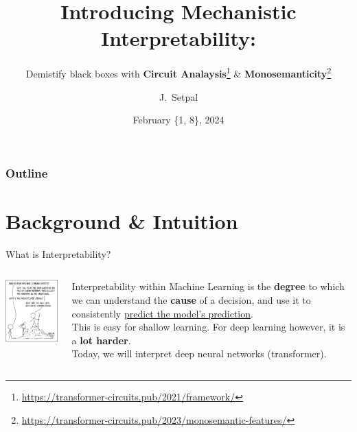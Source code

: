 \documentclass{beamer}
\title[Mechanistic Interpretability]{Introducing Mechanistic Interpretability:}
\subtitle{Demistify black boxes with \textbf{Circuit Analaysis}\thanks{\tiny \url{https://transformer-circuits.pub/2021/framework/}} \& \textbf{Monosemanticity}\thanks{\tiny \url{https://transformer-circuits.pub/2023/monosemantic-features/}}}
\author[Machine Learning @ Purdue] %
{J.~Setpal}
\date{February \{1, 8\}, 2024}
\begin{document}
\frame{\titlepage}


\begin{frame}
\frametitle{Outline}
\tableofcontents
\end{frame}

\section{Background \& Intuition}
\begin{frame}{What is Interpretability?}
	\begin{columns}
		\begin{column}{0.5\textwidth}
			\begin{center}
				\includegraphics[width=5cm]{img/1838} \pause
			\end{center}
		\end{column}
		\begin{column}{0.5\textwidth}
			Interpretability within Machine Learning is the \textbf{degree} to which we can understand the \textbf{cause} of a decision, and use it to consistently \underline{predict the model's prediction}. \pause \newline \\

			This is easy for shallow learning. \pause For deep learning however, it is a \textbf{lot harder}. \pause \newline \\
			Today, we will interpret deep neural networks (transformer). 
		\end{column}
	\end{columns}
\end{frame}
\end{document}
